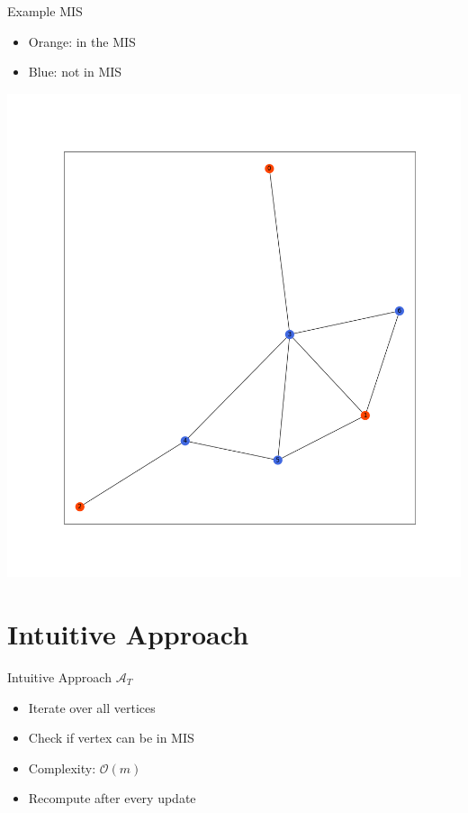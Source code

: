 \documentclass{beamer}
\newcommand{\trivial}{$\mathcal{A}_T$}
\begin{document}
\begin{frame}{Example MIS}
      \begin{itemize}
        \item Orange: in the MIS
        \item Blue: not in MIS
      \end{itemize}
      \centering
      \includegraphics[height=0.7\textheight]{Figure_1.png}
\end{frame}

\section{Intuitive Approach}
\begin{frame}{Intuitive Approach \trivial}
  \begin{itemize}
    \item Iterate over all vertices
    \item Check if vertex can be in MIS
    \item Complexity: $\mathcal{O}(m)$
    \pause
    \bigskip
    \item Recompute after every update
  \end{itemize} 
\end{frame}
\end{document}
